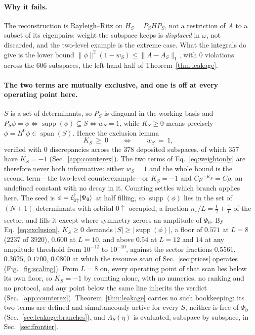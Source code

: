 \paragraph{Why it fails.} The reconstruction is Rayleigh--Ritz on $H_S=P_SHP_S$, not a restriction of
$A$ to a subset of its eigenpairs: weight the subspace keeps is \emph{displaced} in $\omega$, not
discarded, and the two-level example is the extreme case. What the integrals do give is the lower bound
$\lVert\phi\rVert^{2}(1-w_S)\le\lVert A-A_S\rVert_{1}$, with $0$ violations across the $606$ subspaces,
the left-hand half of Theorem~\ref{thm:leakage}.

\paragraph{The two terms are mutually exclusive, and one is off at every operating point here.}
$S$ is a set of determinants, so $P_S$ is diagonal in the working basis and
$P_S\phi=\phi\iff\operatorname{supp}(\phi)\subseteq S\iff w_S=1$, while $K_S\ge0$ means precisely
$\phi=H^{0}\phi\in\operatorname{span}(S)$. Hence the exclusion lemma
\begin{equation}
K_S\ \ge\ 0\qquad\Longleftrightarrow\qquad w_S\ =\ 1 ,
\label{eq:exclusion}
\end{equation}
verified with $0$ discrepancies across the $378$ deposited subspaces, of which $357$ have $K_S=-1$ (Sec.~\ref{app:counterex}). The two terms of
Eq.~\eqref{eq:weightonly} are therefore never both informative: either $w_S=1$ and the whole bound is the
second term---the two-level counterexample---or $K_S=-1$ and $C\rho^{-K_S}=C\rho$, an undefined
constant with no decay in it. Counting settles which branch applies here. The seed is
$\phi=\hat c^{\dagger}_{0\uparrow}\lvert \Psi_0 \rangle$ at half filling, so $\operatorname{supp}(\phi)$ lies in the set of $(N{+}1)$ determinants with orbital $0\!\uparrow$ occupied, a fraction $n_\uparrow/L=\tfrac12+\tfrac1L$ of the sector, and fills it except where symmetry zeroes an amplitude of $\Psi_0$. By Eq.~\eqref{eq:exclusion}, $K_S\ge0$ demands $|S|\ge\lvert\operatorname{supp}(\phi)\rvert$, a floor of $0.571$ at $L=8$ ($2237$ of $3920$), $0.600$ at $L=10$, and above $0.54$ at $L=12$ and $14$ at any amplitude threshold from $10^{-12}$ to $10^{-10}$, against the sector fractions $0.5561$, $0.3625$, $0.1700$, $0.0800$
at which the resource scan of Sec.~\ref{sec:prices} operates (Fig.~\ref{fig:scaling}).
From $L=8$ on, every operating point of that scan lies below its own floor, so $K_S=-1$ by counting
alone, with no
numerics, no ranking and no protocol, and any point below the same line inherits the verdict
(Sec.~\ref{app:counterex}). 
Theorem~\ref{thm:leakage} carries no such
bookkeeping: its two terms are defined and simultaneously active for every $S$, neither is free of
$\Psi_0$ (Sec.~\ref{sec:leakage:branches}), and $\Lambda_S(\eta)$ is evaluated, subspace by subspace, in
Sec.~\ref{sec:frontier}.


